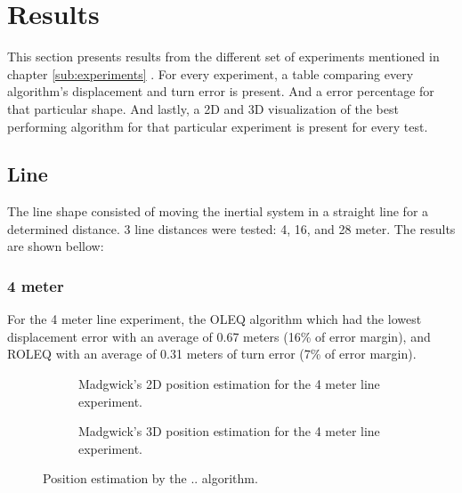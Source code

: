 \section{Results}

This section presents results from the different set of experiments mentioned in chapter \ref{sub:experiments} . For every experiment, a table comparing every algorithm's displacement and turn error is present. And a error percentage for that particular shape. And lastly, a 2D and 3D visualization of the best performing algorithm for that particular experiment is present for every test.

\subsection{Line}

The line shape consisted of moving the inertial system in a straight line for a determined distance. 3 line distances were tested: 4, 16, and 28 meter. The results are shown bellow:

\subsubsection{4 meter}

For the 4 meter line experiment, the OLEQ algorithm which had the lowest displacement error with an average of 0.67 meters (16\% of error margin), and ROLEQ with an average of 0.31 meters of turn error (7\% of error margin).

\begin{figure}[!h]
    \centering
    
\end{figure}

\begin{figure}[!h]
    \centering
    \begin{subfigure}{0.49\textwidth}
        \centering
        \resizebox{1\linewidth}{!}{}
        \caption{ Madgwick's 2D position estimation for the 4 meter line experiment. }
        \label{fig:line4_2D}
    \end{subfigure}
    \begin{subfigure}{0.49\textwidth}
        \centering
        \resizebox{1\linewidth}{!}{}
        \caption{ Madgwick's 3D position estimation for the 4 meter line experiment. }
        \label{fig:line4_3D}
    \end{subfigure}
    \caption{Position estimation by the .. algorithm.}
    \label{fig:line4}
\end{figure}

